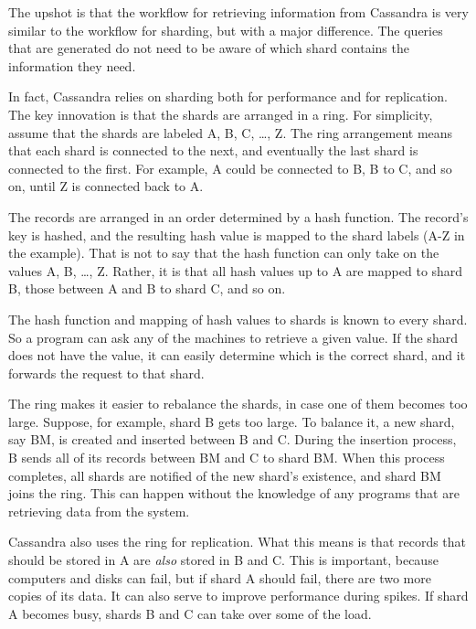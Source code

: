 The upshot is that the workflow for retrieving information from Cassandra 
is very similar to the workflow for sharding, but with a major difference.  
The queries that are generated do not need to be aware of which shard contains the information they need.

In fact, Cassandra relies on sharding both for performance and for replication.  
The key innovation is that the shards are arranged in a ring.  
For simplicity, assume that the shards are labeled A, B, C, \dots, Z.  
The ring arrangement means that each shard is connected to the next, 
and eventually the last shard is connected to the first.  
For example, A could be connected to B, B to C, and so on, until Z is connected back to A.

The records are arranged in an order determined by a hash function.  
The record's key is hashed, and the resulting hash value is mapped to the shard labels (A-Z in the example).
That is not to say that the hash function can only take on the values A, B, \dots, Z.
Rather, it is that all hash values up to A are mapped to shard B, 
those between A and B to shard C, and so on.

The hash function and mapping of hash values to shards is known to every shard.  
So a program can ask any of the machines to retrieve a given value.  
If the shard does not have the value, it can easily determine which is the correct shard, 
and it forwards the request to that shard.

The ring makes it easier to rebalance the shards, in case one of them becomes too large.  
Suppose, for example, shard B gets too large.  
To balance it, a new shard, say BM, is created and inserted between B and C.  
During the insertion process, B sends all of its records between BM and C to shard BM.  
When this process completes, all shards are notified of the new
shard's existence, and shard BM joins the ring.  
This can happen without the knowledge of any programs that are retrieving data from the system.

Cassandra also uses the ring for replication.  
What this means is that records that should be stored in A are \emph{also} stored in B and C.  
This is important, because computers and disks can fail, 
but if shard A should fail, there are two more copies of its data.  
It can also serve to improve performance during spikes.  
If shard A becomes busy, shards B and C can take over some of the load.

